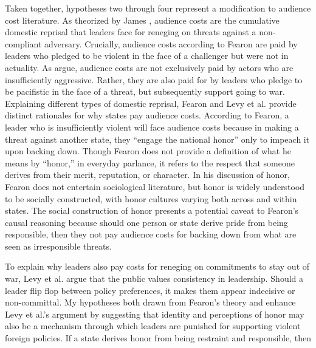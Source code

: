 \documentclass[12pt]{article}
\begin{document}
Taken together, hypotheses two through four represent a  modification to audience cost literature. As theorized by James \citet{fearon_domestic_1994}, audience costs are the cumulative domestic reprisal that leaders face for reneging on threats against a non-compliant adversary. Crucially, audience costs according to Fearon are paid by leaders who pledged to be violent in the face of a challenger but were not in actuality. As \citet{levy_backing_2015} argue, audience costs are not exclusively paid by actors who are insufficiently aggressive. Rather, they are also paid for by leaders who pledge to be pacifistic in the face of a threat, but subsequently support going to war. Explaining different types of domestic reprisal, Fearon and Levy et al. provide distinct rationales for why states pay audience costs. According to Fearon, a leader who is insufficiently violent will face audience costs because in making a threat against another state, they “engage the national honor” only to impeach it upon backing down. Though Fearon does not provide a definition of what he means by “honor,” in everyday parlance, it refers to the respect that someone derives from their merit, reputation, or character. In his discussion of honor, Fearon does not entertain sociological literature, but honor is widely understood to be socially constructed, with honor cultures varying both across and within states. The social construction of honor presents a potential caveat to Fearon's causal reasoning because should one person or state derive pride from being responsible, then they not pay audience costs for backing down from what are seen as irresponsible threats.

To explain why leaders also pay costs for reneging on commitments to stay out of war, Levy et al. argue that the public values consistency in leadership. Should a leader flip flop between policy preferences, it makes them appear indecisive or non-committal. My hypotheses both drawn from Fearon's theory and enhance Levy et al.'s argument by suggesting that identity and perceptions of honor may also be a mechanism through which leaders are punished for supporting violent foreign policies. If a state derives honor from being restraint and responsible, then 
\end{document}
